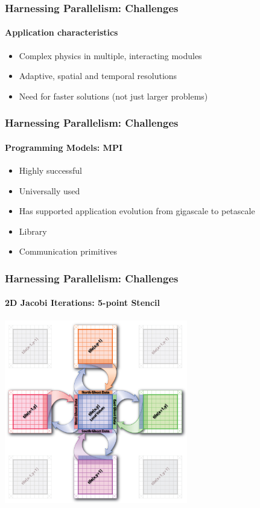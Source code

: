 \begin{frame}[fragile]
\frametitle{Harnessing Parallelism: Challenges}
\framesubtitle{Application characteristics}
  \begin{itemize}
  \item Complex physics in multiple, interacting modules
  \item Adaptive, spatial and temporal resolutions
  \item Need for faster solutions (not just larger problems)
  \end{itemize}
\end{frame}


\begin{frame}[t]
\frametitle{Harnessing Parallelism: Challenges}
\framesubtitle{Programming Models: MPI}
  \begin{itemize}
    \item Highly successful
    \item Universally used
    \item Has supported application evolution from gigascale to petascale
  \end{itemize}
  \begin{itemize}
    \item Library
    \item Communication primitives
  \end{itemize}
\end{frame}


\begin{frame}[fragile]
\frametitle{Harnessing Parallelism: Challenges}
\framesubtitle{2D Jacobi Iterations: 5-point Stencil}
   \begin{center} \includegraphics[width=0.6\textwidth]{figures/2DJacobi_NeighborComm.jpg} \end{center}
\end{frame}



